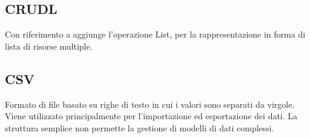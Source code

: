 \vspace{2em}
\subsection*{CRUDL}
\par Con riferimento a  aggiunge l'operazione List, per la rappresentazione in forma di lista di risorse multiple.

\vspace{2em}
\subsection*{CSV}
\par Formato di file basato su righe di testo in cui i valori sono separati da virgole. Viene utilizzato principalmente per l'importazione ed esportazione dei dati. La struttura semplice non permette la gestione di modelli di dati complessi.
